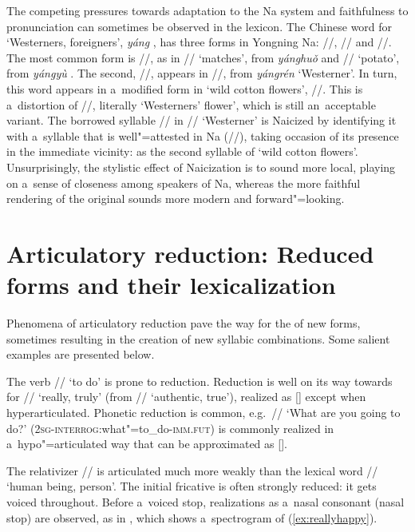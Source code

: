 			The competing pressures towards adaptation to the Na system and faithfulness to 
			pronunciation can sometimes be observed in the lexicon. The Chinese word for ‘Westerners, foreigners’, \textit{yáng} , has three forms in Yongning Na: //, // and //. The most common form is //, as in // ‘matches’, from \textit{yánghuǒ}  and // ‘potato’, from \textit{yángyù} . The second, //, appears in //, from \textit{yángrén} 
			‘Westerner’. In turn, this word appears in a~modified form in ‘wild cotton flowers’, //. This is a~distortion of //, literally ‘Westerners’ flower’, which
			is still an~acceptable variant. The borrowed syllable // in // 
			‘Westerner’ is Naicized by identifying it with a~syllable that is well"=attested in Na (//),
			taking occasion of its presence in the immediate vicinity: as the second syllable of ‘wild cotton flowers’. Unsurprisingly, the stylistic effect of Naicization is to sound
			more local, playing on a~sense of closeness among speakers of Na, whereas the more faithful rendering of the  original sounds more modern and forward"=looking.
			
			
			\section{Articulatory reduction: Reduced forms and their lexicalization}
			\label{sec:articulatoryreductionreducedformsandtheirlexicalization}
			
			
			Phenomena of articulatory reduction pave the way for the  of new forms, sometimes
			resulting in the creation of new syllabic combinations. Some salient examples are presented below.
			
			The verb // ‘to do’ is prone to reduction. Reduction is well on its way towards
			 for // ‘really, truly’ (from // ‘authentic, true’), realized as
			[] except when hyperarticulated. Phonetic reduction is common, e.g.~// ‘What are you going to do?’
			(2\textsc{sg}-\textsc{interrog}:what"=to\_do-\textsc{imm.fut}) is commonly
			realized in a~hypo"=articulated way that can be approximated as [].
			
			The {relativizer} // is articulated much more weakly than the lexical word
			// ‘human being, person’. The initial fricative is often strongly reduced: it gets voiced
			throughout. Before a~voiced stop, realizations as a~nasal consonant (nasal stop) are observed, as in
			, which shows a~spectrogram of (\ref{ex:reallyhappy}). 
			
